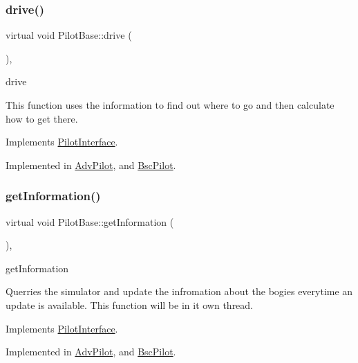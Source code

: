\subsubsection{\texorpdfstring{drive()}{drive()}}
{\footnotesize\ttfamily virtual void Pilot\+Base\+::drive (\begin{DoxyParamCaption}{ }\end{DoxyParamCaption})\hspace{0.3cm}{\ttfamily [protected]}, {}}



drive 

This function uses the information to find out where to go and then calculate how to get there. 

Implements \hyperlink{classPilotInterface_a73569195611ac3b77b85b8c3a317b1cf}{Pilot\+Interface}.



Implemented in \hyperlink{classAdvPilot_a06a08829ecef443f01860f48fc462c22}{Adv\+Pilot}, and \hyperlink{classBscPilot_af73cc7f821a08574eae05be8c5806646}{Bsc\+Pilot}.

\mbox{\label{classPilotBase_a0c3cfd1b468842734e3706ff8dea133b}} 
\subsubsection{\texorpdfstring{get\+Information()}{getInformation()}}
{\footnotesize\ttfamily virtual void Pilot\+Base\+::get\+Information (\begin{DoxyParamCaption}{ }\end{DoxyParamCaption})\hspace{0.3cm}{\ttfamily [protected]}, {}}



get\+Information 

Querries the simulator and update the infromation about the bogies everytime an update is available. This function will be in it own thread. 

Implements \hyperlink{classPilotInterface_a8f328815397986cc26fc8baa2bb538e2}{Pilot\+Interface}.



Implemented in \hyperlink{classAdvPilot_a1a7f8ca0d8c97120fa2c93f7e512c944}{Adv\+Pilot}, and \hyperlink{classBscPilot_aa40dc622dc2c856c0a8b2e8c61970f00}{Bsc\+Pilot}.

